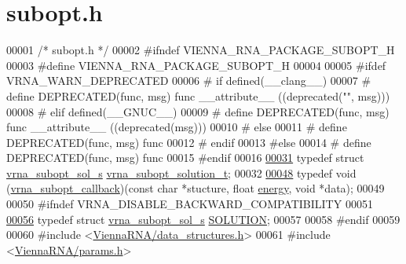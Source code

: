 \hypertarget{subopt_8h_source}{}\section{subopt.\+h}
\label{subopt_8h_source}

\begin{DoxyCode}
00001 \textcolor{comment}{/* subopt.h */}
00002 \textcolor{preprocessor}{#ifndef VIENNA\_RNA\_PACKAGE\_SUBOPT\_H}
00003 \textcolor{preprocessor}{#define VIENNA\_RNA\_PACKAGE\_SUBOPT\_H}
00004 
00005 \textcolor{preprocessor}{#ifdef VRNA\_WARN\_DEPRECATED}
00006 \textcolor{preprocessor}{# if defined(\_\_clang\_\_)}
00007 \textcolor{preprocessor}{#  define DEPRECATED(func, msg) func \_\_attribute\_\_ ((deprecated("", msg)))}
00008 \textcolor{preprocessor}{# elif defined(\_\_GNUC\_\_)}
00009 \textcolor{preprocessor}{#  define DEPRECATED(func, msg) func \_\_attribute\_\_ ((deprecated(msg)))}
00010 \textcolor{preprocessor}{# else}
00011 \textcolor{preprocessor}{#  define DEPRECATED(func, msg) func}
00012 \textcolor{preprocessor}{# endif}
00013 \textcolor{preprocessor}{#else}
00014 \textcolor{preprocessor}{# define DEPRECATED(func, msg) func}
00015 \textcolor{preprocessor}{#endif}
00016 
\hyperlink{subopt_8h_a01ae9a0f27d245d89f705afd843fc457}{00031} \textcolor{keyword}{typedef} \textcolor{keyword}{struct }\hyperlink{structvrna__subopt__sol__s}{vrna\_subopt\_sol\_s}   \hyperlink{structvrna__subopt__sol__s}{vrna\_subopt\_solution\_t};
00032 
\hyperlink{group__subopt__wuchty_gaa0270c66d04f59e750401695b8282e04}{00048} \textcolor{keyword}{typedef} void (\hyperlink{group__subopt__wuchty_gaa0270c66d04f59e750401695b8282e04}{vrna\_subopt\_callback})(\textcolor{keyword}{const} \textcolor{keywordtype}{char} *stucture, \textcolor{keywordtype}{float} 
      \hyperlink{structvrna__subopt__sol__s_a99bc26ca68392aa4656386cf73b73fef}{energy}, \textcolor{keywordtype}{void} *data);
00049 
00050 \textcolor{preprocessor}{#ifndef VRNA\_DISABLE\_BACKWARD\_COMPATIBILITY}
00051 
\hyperlink{subopt_8h_aa0f46ff02e1017469cf902d02ecd7f9a}{00056} \textcolor{keyword}{typedef} \textcolor{keyword}{struct }\hyperlink{structvrna__subopt__sol__s}{vrna\_subopt\_sol\_s}   \hyperlink{structvrna__subopt__sol__s}{SOLUTION};
00057 
00058 \textcolor{preprocessor}{#endif}
00059 
00060 \textcolor{preprocessor}{#include <\hyperlink{data__structures_8h}{ViennaRNA/data\_structures.h}>}
00061 \textcolor{preprocessor}{#include <\hyperlink{params_8h}{ViennaRNA/params.h}>}

\end{DoxyCode}
